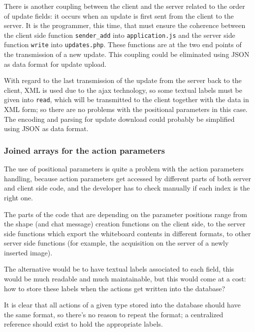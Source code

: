 \documentclass[10pt,a4paper,english]{book}
\begin{document}
There is another coupling between the client and the server related to
the order of update fields: it occurs when an update is first sent
from the client to the server. It is the programmer, this time, that
must ensure the coherence between the client side function
\texttt{sender{\_}add} into \texttt{application.js} and the server side function
\texttt{write} into \texttt{updates.php}. These functions are at the two end
points of the transmission of a new update. This coupling could be
eliminated using JSON as data format for update upload.

With regard to the last transmission of the update from the server
back to the client, XML is used due to the ajax technology, so some
textual labels must be given into \texttt{read}, which will be transmitted
to the client together with the data in XML form; so there are no
problems with the positional parameters in this case. The encoding and
parsing for update download could probably be simplified using JSON as
data format.



\hypertarget{joined-arrays-for-the-action-parameters}{}
\subsubsection{Joined arrays for the action parameters}
\label{joined-arrays-for-the-action-parameters}

The use of positional parameters is quite a problem with the action
parameters handling, because action parameters get accessed by
different parts of both server and client side code, and the developer
has to check manually if each index is the right one.

The parts of the code that are depending on the parameter positions
range from the shape (and chat message) creation functions on the
client side, to the server side functions which export the whiteboard
contents in different formats, to other server side functions (for
example, the acquisition on the server of a newly inserted image).

The alternative would be to have textual labels associated to each
field, this would be much readable and much maintainable, but this
would come at a cost: how to store these labels when the actions get
written into the database?

It is clear that all actions of a given type stored into the database
should have the same format, so there's no reason to repeat the
format; a centralized reference should exist to hold the appropriate
labels.
\end{document}
